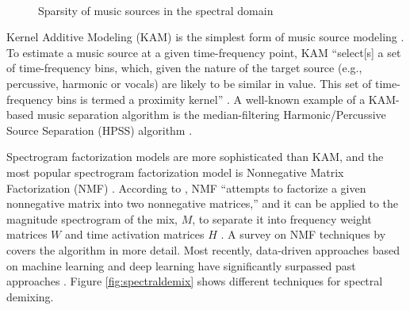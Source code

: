 \documentclass[report.tex]{subfiles}
\begin{document}
\begin{figure}[ht]
	\centering
	\\
	\caption{Sparsity of music sources in the spectral domain \parencite[32]{musicsepgood}}
\label{fig:sepgood}
\end{figure}

Kernel Additive Modeling (KAM) is the simplest form of music source modeling \parencite{musicsepgood}. To estimate a music source at a given time-frequency point, KAM ``select[s] a set of time-frequency bins, which, given the nature of the target source (e.g., percussive, harmonic or vocals) are likely to be similar in value. This set of time-frequency bins is termed a proximity kernel'' \parencite[36]{musicsepgood}. A well-known example of a KAM-based music separation algorithm is the median-filtering Harmonic/Percussive Source Separation (HPSS) algorithm \parencite{fitzgerald1}.

Spectrogram factorization models are more sophisticated than KAM, and the most popular spectrogram factorization model is Nonnegative Matrix Factorization (NMF) \parencite{musicmask, musicsepgood}. According to \citeauthor{musicsepgood}, NMF ``attempts to factorize a given nonnegative matrix into two nonnegative matrices,'' and it can be applied to the magnitude spectrogram of the mix, $M$, to separate it into frequency weight matrices $W$ and time activation matrices $H$ \parencite[37]{musicsepgood}. A survey on NMF techniques by \textcite{nmfpaper} covers the algorithm in more detail. Most recently, data-driven approaches based on machine learning and deep learning have significantly surpassed past approaches \parencite{musicsepgood, sisec2018}. Figure \ref{fig:spectraldemix} shows different techniques for spectral demixing.
\end{document}
